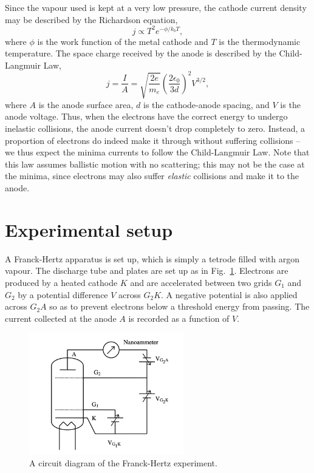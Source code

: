 \documentclass[11pt]{article}
\begin{document}
        Since the vapour used is kept at a very low pressure, the cathode current density may be described by the Richardson equation,
        \[
                j \propto T^2e^{-\phi /k_b T},
        \]
        where $\phi$ is the work function of the metal cathode and $T$ is the thermodynamic temperature.
        The space charge received by the anode is described by the Child-Langmuir Law,
        \[
                j = \frac{I}{A} = \sqrt{\frac{2e}{m_e}} \left(\frac{2\epsilon_0}{3d}\right)^2 V^{3 /2},
        \]
        where $A$ is the anode surface area, $d$ is the cathode-anode spacing, and $V$ is the anode voltage.
        Thus, when the electrons have the correct energy to undergo inelastic collisions, the anode current doesn't drop completely to zero.
        Instead, a proportion of electrons do indeed make it through without suffering collisions -- we thus expect the minima currents
        to follow the Child-Langmuir Law. Note that this law assumes ballistic motion with no scattering; this may not be the case at the 
        minima, since electrons may also suffer \textit{elastic} collisions and make it to the anode.
        
        \section{Experimental setup}
        A Franck-Hertz apparatus is set up, which is simply a tetrode filled with argon vapour.
        The discharge tube and plates are set up as in Fig.~\ref{fig:FH}.
        Electrons are produced by a heated cathode $K$ and are accelerated between two grids $G_1$ and $G_2$ by a potential
        difference $V$ across $G_2K$. A negative potential is also applied across $G_2A$ so as to prevent electrons below
        a threshold energy from passing. The current collected at the anode $A$ is recorded as a function of $V$.

        \begin{figure}[h]
                \centering
                \includegraphics[width=0.6\textwidth]{./FH.png}
                \caption{A circuit diagram of the Franck-Hertz experiment.}
                \label{fig:FH}
        \end{figure}
        
\end{document}
